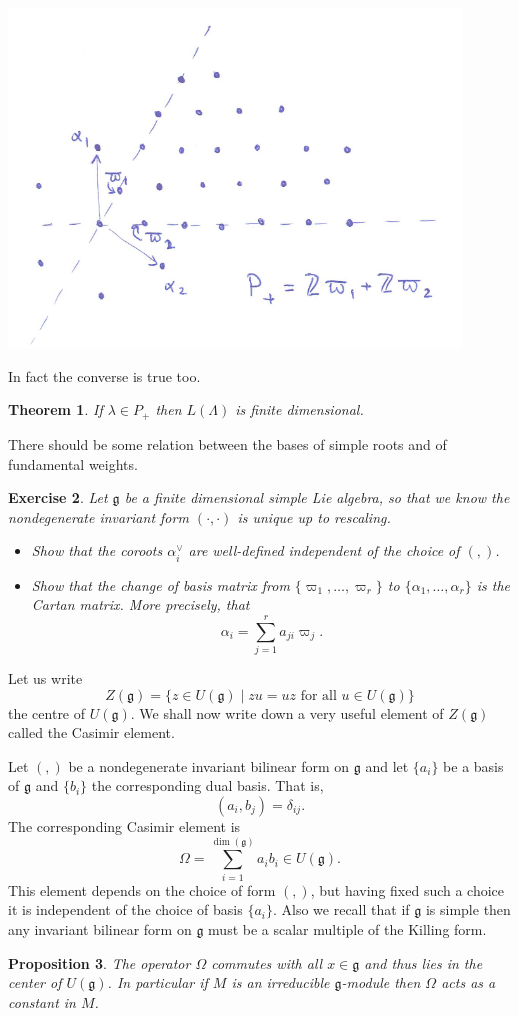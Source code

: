 \documentclass[12pt]{article}
\theoremstyle{plain}
\newtheorem{thm}{Theorem}[section]
\newtheorem{prop}[thm]{Proposition}
\newtheorem{exer}[thm]{Exercise}
\theoremstyle{definition}
\numberwithin{equation}{section}
\newcommand{\al}{\alpha}
\newcommand{\La}{\Lambda}
\newcommand{\g}{\mathfrak{g}}
\begin{document}
\begin{center}
\includegraphics[width=120mm]{P+sl3.png}
\end{center}

In fact the converse is true too.
\begin{thm}\label{thm:P+.implies.fin.dim}
If $\lambda \in P_+$ then $L(\La)$ is finite dimensional.
\end{thm}

There should be some relation between the bases of simple roots and of fundamental weights.
\begin{exer}
Let $\g$ be a finite dimensional simple Lie algebra, so that we know the nondegenerate invariant form $(\cdot, \cdot)$ is unique up to rescaling.
\begin{itemize}
\item Show that the coroots $\al_i^\vee$ are well-defined independent of the choice of $(,)$.

\item Show that the change of basis matrix from $\{\varpi_1, \ldots, \varpi_r\}$ to $\{\al_1, \ldots, \al_r\}$ is the Cartan matrix. More precisely, that
\[
\al_i = \sum_{j=1}^r a_{ji} \varpi_j.
\]
\end{itemize}
\end{exer}

Let us write
\[
Z(\g) = \{z \in U(\g) \mid \text{$zu = uz$ for all $u \in U(\g)$}\}
\]
the centre of $U(\g)$. We shall now write down a very useful element of $Z(\g)$ called the Casimir element.


Let $(,)$ be a nondegenerate invariant bilinear form on $\g$ and let $\{a_i\}$ be a basis of $\g$ and $\{b_i\}$ the corresponding dual basis. That is,
\[
(a_i, b_j) = \delta_{ij}.
\]
The corresponding Casimir element is
\[
\Omega = \sum_{i=1}^{\dim(\g)} a_i b_i \in U(\g).
\]
This element depends on the choice of form $(,)$, but having fixed such a choice it is independent of the choice of basis $\{a_i\}$. Also we recall that if $\g$ is simple then any invariant bilinear form on $\g$ must be a scalar multiple of the Killing form.
\begin{prop}
The operator $\Omega$ commutes with all $x \in \g$ and thus lies in the center of $U(\g)$. In particular if $M$ is an irreducible $\g$-module then $\Omega$ acts as a constant in $M$.
\end{prop}
\end{document}
